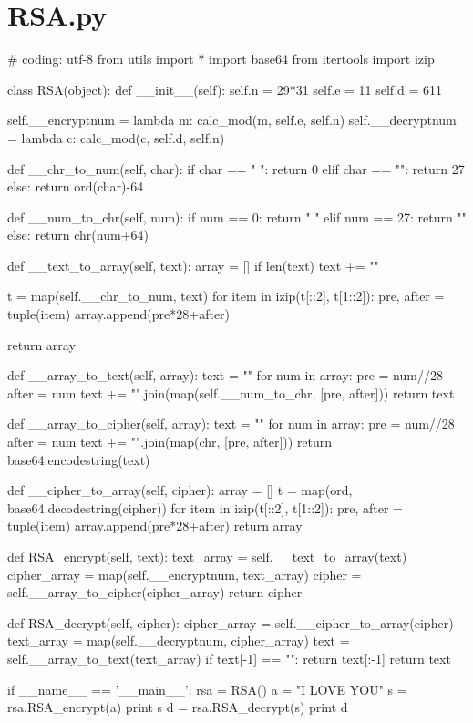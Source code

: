 \documentclass[UTF8,nofonts,cs4size]{ctexrep}
\begin{document}
\section*{RSA.py}
\begin{python}
# coding: utf-8
from utils import *
import base64
from itertools import izip

class RSA(object):
    def __init__(self):
        self.n = 29*31
        self.e = 11
        self.d = 611

        self.__encryptnum = lambda m: calc_mod(m, self.e, self.n)
        self.__decryptnum = lambda c: calc_mod(c, self.d, self.n)

    def __chr_to_num(self, char):
        if char == " ":
            return 0
        elif char == "\0":
            return 27
        else:
            return ord(char)-64

    def __num_to_chr(self, num):
        if num == 0:
            return " "
        elif num == 27:
            return "\0"
        else:
            return chr(num+64)

    def __text_to_array(self, text):
        array = []
        if len(text)%
            text += "\0"

        t = map(self.__chr_to_num, text)
        for item in izip(t[::2], t[1::2]):
            pre, after = tuple(item)
            array.append(pre*28+after)

        return array

    def __array_to_text(self, array):
        text = ""
        for num in array:
            pre = num//28
            after = num%
            text += "".join(map(self.__num_to_chr, [pre, after]))
        return text

    def __array_to_cipher(self, array):
        text = ""
        for num in array:
            pre = num//28
            after = num%
            text += "".join(map(chr, [pre, after]))
        return base64.encodestring(text)

    def __cipher_to_array(self, cipher):
        array = []
        t = map(ord, base64.decodestring(cipher))
        for item in izip(t[::2], t[1::2]):
            pre, after = tuple(item)
            array.append(pre*28+after)
        return array

    def RSA_encrypt(self, text):
        text_array = self.__text_to_array(text)
        cipher_array = map(self.__encryptnum, text_array)
        cipher = self.__array_to_cipher(cipher_array)
        return cipher

    def RSA_decrypt(self, cipher):
        cipher_array = self.__cipher_to_array(cipher)
        text_array = map(self.__decryptnum, cipher_array)
        text = self.__array_to_text(text_array)
        if text[-1] == "\0":
            return text[:-1]
        return text

if __name__ == '__main__':
    rsa = RSA()
    a = "I LOVE YOU"
    s = rsa.RSA_encrypt(a)
    print s
    d = rsa.RSA_decrypt(s)
    print d

\end{python}
\end{document}
